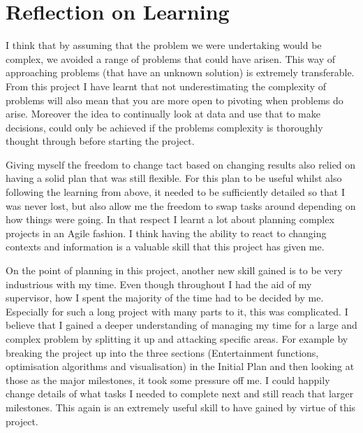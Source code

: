 \documentclass[12pt]{report}
\begin{document}
\section{Reflection on Learning}\label{Reflection}

I think that by assuming that the problem we were undertaking would be complex, we avoided a range of problems that could have arisen. This way of approaching problems (that have an unknown solution) is extremely transferable. From this project I have learnt that not underestimating the complexity of problems will also mean that you are more open to pivoting when problems do arise. Moreover the idea to continually look at data and use that to make decisions, could only be achieved if the problems complexity is thoroughly thought through before starting the project.

Giving myself the freedom to change tact based on changing results also relied on having a solid plan that was still flexible. For this plan to be useful whilst also following the learning from above, it needed to be sufficiently detailed so that I was never lost, but also allow me the freedom to swap tasks around depending on how things were going. In that respect I learnt a lot about planning complex projects in an Agile fashion. I think having the ability to react to changing contexts and information is a valuable skill that this project has given me.

On the point of planning in this project, another new skill gained is to be very industrious with my time. Even though throughout I had the aid of my supervisor, how I spent the majority of the time had to be decided by me. Especially for such a long project with many parts to it, this was complicated. I believe that I gained a deeper understanding of managing my time for a large and complex problem by splitting it up and attacking specific areas. For example by breaking the project up into the three sections (Entertainment functions, optimisation algorithms and visualisation) in the Initial Plan and then looking at those as the major milestones, it took some pressure off me. I could happily change details of what tasks I needed to complete next and still reach that larger milestones. This again is an extremely useful skill to have gained by virtue of this project.
\end{document}
